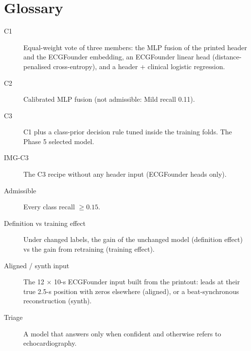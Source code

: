 \section{Glossary}\label{app:glossary}
\begin{description}
  \item[C1] Equal-weight vote of three members: the MLP fusion of the printed header and the ECGFounder embedding, an
    ECGFounder linear head (distance-penalised cross-entropy), and a header + clinical logistic regression.
  \item[C2] Calibrated MLP fusion (not admissible: Mild recall 0.11).
  \item[C3] C1 plus a class-prior decision rule tuned inside the training folds. The Phase 5 selected model.
  \item[IMG-C3] The C3 recipe without any header input (ECGFounder heads only).
  \item[Admissible] Every class recall $\ge 0.15$.
  \item[Definition vs training effect] Under changed labels, the gain of the unchanged model (definition effect)
    vs the gain from retraining (training effect).
  \item[Aligned / synth input] The 12 $\times$ 10-s ECGFounder input built from the printout: leads at their true
    2.5-s position with zeros elsewhere (aligned), or a beat-synchronous reconstruction (synth).
  \item[Triage] A model that answers only when confident and otherwise refers to echocardiography.
\end{description}

